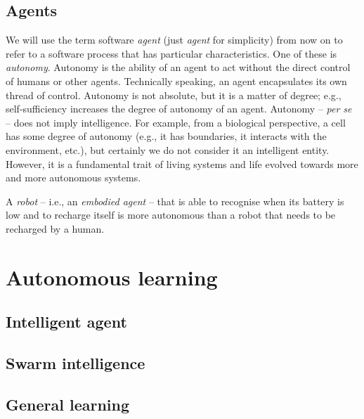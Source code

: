 \subsubsection{}\label{subsubsec:rl}

\subsection{Agents}\label{subsec:agents}
%
We will use the term software \emph{agent} (just \emph{agent} for simplicity) from now on to refer to a software process that has particular characteristics.
%
One of these is \emph{autonomy}.
%
Autonomy is the ability of an agent to act without the direct control of humans or other agents.
%
Technically speaking, an agent encapsulates its own thread of control.
%
Autonomy is not absolute, but it is a matter of degree; e.g., self-sufficiency increases the degree of autonomy of an agent.
%
Autonomy -- \emph{per se} -- does not imply intelligence.
%
For example, from a biological perspective, a cell has some degree of autonomy (e.g., it has boundaries, it interacts with the environment, etc.), but certainly we do not consider it an intelligent entity.
%
However, it is a fundamental trait of living systems and life evolved towards more and more autonomous systems.


A \emph{robot} -- i.e., an \emph{embodied agent} -- that is able to recognise when its battery is low and to recharge itself is more autonomous than a robot that needs to be recharged by a human.


\section{Autonomous learning}\label{sec:autonomous-learning}

\subsection{Intelligent agent}\label{subsec:intelligent-agent}

\subsection{}\label{subsec:mas}

\subsection{Swarm intelligence}\label{subsec:swarm-intelligence}


\subsection{General learning}\label{subsec:general-learning}
